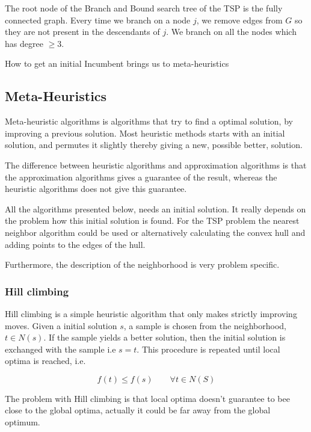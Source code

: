 \documentclass[10pt]{article}
\begin{document}
The root node of the Branch and Bound search tree of the TSP is the fully connected graph. Every time we branch on a node $j$, we remove edges from $G$ so they are not present in the descendants of $j$. We branch on all the nodes which has degree $\geq 3$.

How to get an initial Incumbent brings us to meta-heuristics



\subsection{Meta-Heuristics} %
\label{sub:heuristics}

Meta-heuristic algorithms is algorithms that try to find a optimal solution, by improving a previous solution. Most heuristic methods starts with an initial solution, and permutes it slightly thereby giving a new, possible better, solution. 

The difference between heuristic algorithms and approximation algorithms is that the approximation algorithms gives a guarantee of the result, whereas the heuristic algorithms does not give this guarantee.  

All the algorithms presented below, needs an initial solution. It really depends on the problem how this initial solution is found. For the TSP problem the nearest neighbor algorithm could be used or alternatively calculating the convex hull and adding points to the edges of the hull.

Furthermore, the description of the neighborhood is very problem specific.

\subsubsection{Hill climbing} %
\label{ssub:hill_climbing}
Hill climbing is a simple heuristic algorithm that only makes strictly improving moves. Given a initial solution $s$, a sample is chosen from the neighborhood, $t \in N(s)$. If the sample yields a better solution, then the initial solution is exchanged with the sample i.e $s=t$. This procedure is repeated until local optima is reached, i.e. 

\begin{equation}
  f(t) \leq f(s) \qquad \forall t \in N(S)
\end{equation}

The problem with Hill climbing is that local optima doesn't guarantee to bee close to the global optima, actually it could be far away from the global optimum.
\end{document}
